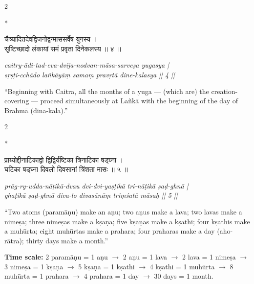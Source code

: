 \documentclass[11pt,a4paper]{article}
\newcommand{\dev}[1]{{\devanagarifont #1}}
\theoremstyle{definition}
\begin{document}
\vspace{0.3cm}

\begin{paracol}{2}

\switchcolumn[0]*\noindent
\begin{tcolorbox}[colback=sktbg,colframe=vertrule,boxrule=0.5pt,arc=3pt,title={\small\bfseries Verse 4}]
\dev{चैत्र्यादितदेवद्विजनोद्वन्माससर्वेष युगस्य ।\\
सृष्टिच्छादो लंकायां समं प्रवृता दिनेकलस्य ॥ ४ ॥}
\end{tcolorbox}

\switchcolumn\noindent
\begin{tcolorbox}[colback=transbg,colframe=vertrule!60,boxrule=0.5pt,arc=3pt,title={\small\bfseries Translation 4}]
\textit{caitry-\=adi-tad-eva-dvija-nodvan-m\=asa-sarve\d{s}a yugasya |\\
s\d{r}\d{s}\d{t}i-cch\=ado la\~nk\=ay\=a\d{m} sama\d{m} prav\d{r}t\=a dine-kalasya || 4 ||}

``Beginning with Caitra, all the months of a yuga --- (which are) the creation-covering --- proceed simultaneously at La\~nk\=a with the beginning of the day of Brahm\=a (dina-kala).''
\end{tcolorbox}

\end{paracol}

\vspace{0.3cm}

\begin{paracol}{2}

\switchcolumn[0]*\noindent
\begin{tcolorbox}[colback=sktbg,colframe=vertrule,boxrule=0.5pt,arc=3pt,title={\small\bfseries Verse 5}]
\dev{प्राग्र्योद्दीनाटिकाद्वो द्विद्विर्यष्टिका त्रिनाटिका षड्घ्ना ।\\
घटिका षड्घ्ना दिवलो दिवसानां त्रिंशता मासः ॥ ५ ॥}
\end{tcolorbox}

\switchcolumn\noindent
\begin{tcolorbox}[colback=transbg,colframe=vertrule!60,boxrule=0.5pt,arc=3pt,title={\small\bfseries Translation 5}]
\textit{pr\=ag-ry-udda-n\=a\d{t}ik\=a-dvau dvi-dvi-ya\d{s}\d{t}ik\=a tri-n\=a\d{t}ik\=a \d{s}a\d{d}-ghn\=a |\\
gha\d{t}ik\=a \d{s}a\d{d}-ghn\=a diva-lo divas\=an\=a\d{m} tri\d{m}\'sat\=a m\=asa\d{h} || 5 ||}

``Two atoms (param\=a\d{n}u) make an a\d{n}u; two a\d{n}us make a lava; two lavas make a nime\d{s}a; three nime\d{s}as make a k\d{s}a\d{n}a; five k\d{s}a\d{n}as make a k\d{s}athi; four k\d{s}athis make a muh\=urta; eight muh\=urtas make a prahara; four praharas make a day (aho-r\=atra); thirty days make a month.''

\textbf{Time scale:} 2 param\=a\d{n}u = 1 a\d{n}u $\to$ 2 a\d{n}u = 1 lava $\to$ 2 lava = 1 nime\d{s}a $\to$ 3 nime\d{s}a = 1 k\d{s}a\d{n}a $\to$ 5 k\d{s}a\d{n}a = 1 k\d{s}athi $\to$ 4 k\d{s}athi = 1 muh\=urta $\to$ 8 muh\=urta = 1 prahara $\to$ 4 prahara = 1 day $\to$ 30 days = 1 month.
\end{tcolorbox}

\end{paracol}
\end{document}
